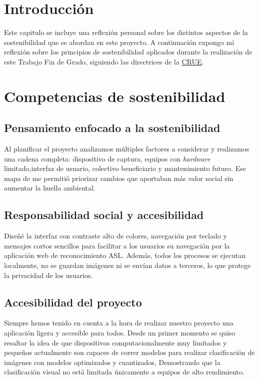 
\section{Introducción}
Este capitulo se incluye una reflexión personal sobre los distintos aspectos de la sostenibilidad que se abordan en este proyecto. A continuación expongo mi reflexión sobre los principios de sostenibilidad aplicados durante la realización de este Trabajo Fin de Grado, siguiendo las directrices de la \href{https://www.crue.org/wp-content/uploads/2020/02/Directrices_Sosteniblidad_Crue2012.pdf}{CRUE}.


\section{Competencias de sostenibilidad}

\subsection{Pensamiento enfocado a la sostenibilidad}
Al planificar el proyecto analizamos múltiples factores a considerar y realizamos una cadena completa: dispositivo de captura, equipos con \textit{hardware} limitado,interfaz de usuario, colectivo beneficiario y mantenimiento futuro. Ese mapa de me permitió priorizar cambios que aportaban más valor social sin aumentar la huella ambiental.

\subsection{Responsabilidad social y accesibilidad}
Diseñé la interfaz con contraste alto de colores, navegación por teclado y mensajes cortos sencillos para facilitar a los usuarios su navegación por la aplicación web de reconocimiento ASL. Además, todos los procesos se ejecutan localmente, no se guardan imágenes ni se envían datos a terceros, lo que protege la privacidad de los usuarios. 

\subsection{Accesibilidad del proyecto}
Siempre hemos tenido en cuenta a la hora de realizar nuestro proyecto una aplicación ligera y accesible para todos. Desde un primer momento se quiso resaltar la idea de que dispositivos computacionalmente muy limitados y pequeños actualmente son capaces de correr modelos para realizar clasificación de imágenes con modelos optimizados y cuantizados, Demostrando que la clasificación visual no está limitada únicamente a equipos de alto rendimiento.

